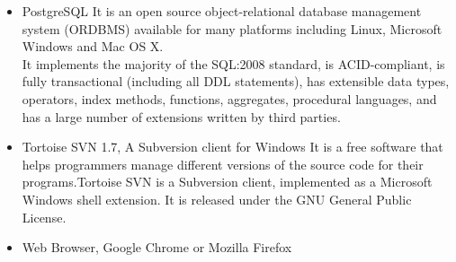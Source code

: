 \documentclass[amsart, 12pt]{article}
\begin{document}
\begin{itemize}
\item PostgreSQL
It is an open source object-relational database management system (ORDBMS) available for many platforms including Linux, Microsoft Windows and Mac OS X. \\
It implements the majority of the SQL:2008 standard, is ACID-compliant, is fully transactional (including all DDL statements), has extensible data types, operators, index methods, functions, aggregates, procedural languages, and has a large number of extensions written by third parties.

\item Tortoise SVN 1.7, A Subversion client for Windows
It is a free software that helps programmers manage different versions of the source code for their programs.Tortoise SVN is a Subversion client, implemented as a Microsoft Windows shell extension. It is released under the GNU General Public License.

\item Web Browser, Google Chrome or Mozilla Firefox
\end{itemize}
\end{document}
